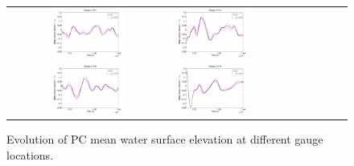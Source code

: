 \begin{figure}[h]
\begin{tabular}{clc}
        
\includegraphics[width=0.475\textwidth]{./figures/musigma1.pdf} &
\includegraphics[width=0.475\textwidth]{./figures/musigma2.pdf} \\
\includegraphics[width=0.475\textwidth]{./figures/musigma3.pdf} &
\includegraphics[width=0.475\textwidth]{./figures/musigma4.pdf}
\end{tabular}
\caption{Evolution of PC mean water surface elevation at different gauge locations.}
\label{fig:ave}
\end{figure}

